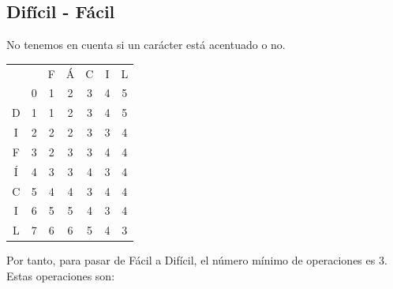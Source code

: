 \documentclass[10pt,a4paper,spanish]{report}
\theoremstyle{definition}
\theoremstyle{remark}
\begin{document}
\subsection{\textcolor{amethyst}Difícil - \textcolor{amethyst}Fácil}
No tenemos en cuenta si un carácter está acentuado o no.
\begin{center}
\begin{tabular}{c|c|c|c|c|c|c|}
\multicolumn{2}{r}{} & \multicolumn{1}{c}{F} & \multicolumn{1}{c}{Á} & \multicolumn{1}{c}{C} & \multicolumn{1}{c}{I} & \multicolumn{1}{c}{L} \\ 
\cline{2-7} 
 & 0 & 1 & 2 & 3 & 4 & 5 \\
\cline{2-7}
D & 1 & 1 & 2 & 3 & 4 & 5 \\
\cline{2-7} 
I & 2 & 2 & 2 & 3 & 3 & 4 \\
\cline{2-7} 
F & 3 & 2 & 3 & 3 & 4 & 4 \\
\cline{2-7} 
Í & 4 & 3 & 3 & 4 & 3 & 4 \\
\cline{2-7} 
C & 5 & 4 & 4 & 3 & 4 & 4 \\
\cline{2-7} 
I & 6 & 5 & 5 & 4 & 3 & 4 \\
\cline{2-7} 
L & 7 & 6 & 6 & 5 & 4 & \cellcolor{Green}3 \\
\cline{2-7}  
\end{tabular}
\end{center}

Por tanto, para pasar de Fácil a Difícil, el número mínimo de operaciones es 3. Estas operaciones son:
\end{document}
